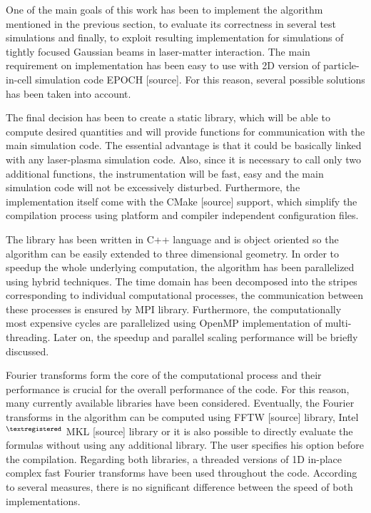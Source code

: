 One of the main goals of this work has been to implement the algorithm mentioned in the previous section, to evaluate its correctness in several test simulations and finally, to exploit resulting implementation for simulations of tightly focused Gaussian beams in laser-matter interaction. The main requirement on implementation has been easy to use with 2D version of particle-in-cell simulation code EPOCH [source]. For this reason, several possible solutions has been taken into account.

The final decision has been to create a static library, which will be able to compute desired quantities and will provide functions for communication with the main simulation code. The essential advantage is that it could be basically linked with any laser-plasma simulation code. Also, since it is necessary to call only two additional functions, the instrumentation will be fast, easy and the main simulation code will not be excessively disturbed. Furthermore, the implementation itself come with the CMake [source] support, which simplify the compilation process using platform and compiler independent configuration files.

The library has been written in C++ language and is object oriented so the algorithm can be easily extended to three dimensional geometry. In order to speedup the whole underlying computation, the algorithm has been parallelized using hybrid techniques. The time domain has been decomposed into the stripes corresponding to individual computational processes, the communication between these processes is ensured by MPI library. Furthermore, the computationally most expensive cycles are parallelized using OpenMP implementation of multi-threading. Later on, the speedup and parallel scaling performance will be briefly discussed.

Fourier transforms form the core of the computational process and their performance is crucial for the overall performance of the code. For this reason, many currently available libraries have been considered. Eventually, the Fourier transforms in the algorithm can be computed using FFTW [source] library, Intel$ ^{\scriptsize \textregistered} $ MKL [source] library or it is also possible to directly evaluate the formulas without using any additional library. The user specifies his option before the compilation. Regarding both libraries, a threaded versions of 1D in-place complex fast Fourier transforms have been used throughout the code. According to several measures, there is no significant difference between the speed of both implementations.

